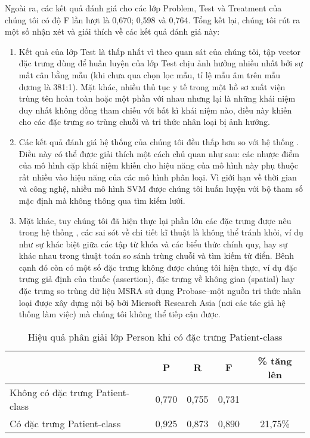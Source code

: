 Ngoài ra, các kết quả đánh giá cho các lớp Problem, Test và Treatment của chúng tôi có độ F lần lượt là 0,670; 0,598 và 0,764. Tổng kết lại, chúng tôi rút ra một số nhận xét và giải thích về các kết quả đánh giá này:
\begin{enumerate}
\item Kết quả của lớp Test là thấp nhất vì theo quan sát của chúng tôi, tập vector đặc trưng dùng để huấn luyện của lớp Test chịu ảnh hưởng nhiều nhất bởi sự mất cân bằng mẫu (khi chưa qua chọn lọc mẫu, tỉ lệ mẫu âm trên mẫu dương là 381:1). Mặt khác, nhiều thủ tục y tế trong một hồ sơ xuất viện trùng tên hoàn toàn hoặc một phần với nhau nhưng lại là những khái niệm duy nhất không đồng tham chiếu với bất kì khái niệm nào, điều này khiến cho các đặc trưng so trùng chuỗi và tri thức nhân loại bị ảnh hưởng.
\item Các kết quả đánh giá hệ thống của chúng tôi đều thấp hơn so với hệ thống \cite{YanXu2012}. Điều này có thể được giải thích một cách chủ quan như sau: các nhược điểm của mô hình cặp khái niệm khiến cho hiệu năng của mô hình này phụ thuộc rất nhiều vào hiệu năng của các mô hình phân loại. Vì giới hạn về thời gian và công nghệ, nhiều mô hình SVM được chúng tôi huấn luyện với bộ tham số mặc định mà không thông qua tìm kiếm lưới.
\item Mặt khác, tuy chúng tôi đã hiện thực lại phần lớn các đặc trưng được nêu trong hệ thống \cite{YanXu2012}, các sai sót về chi tiết kĩ thuật là không thể tránh khỏi, ví dụ như sự khác biệt giữa các tập từ khóa và các biểu thức chính quy, hay sự khác nhau trong thuật toán so sánh trùng chuỗi và tìm kiếm từ điển. Bênh cạnh đó còn có một số đặc trưng không được chúng tôi hiện thực, ví dụ đặc trưng giả định của thuốc (assertion), đặc trưng về không gian (spatial) hay đặc trưng so trùng dữ liệu MSRA sử dụng Probase--một nguồn tri thức nhân loại được xây dựng nội bộ bởi Micrsoft Research Asia (nơi các tác giả hệ thống \cite{YanXu2012} làm việc) mà chúng tôi không thể tiếp cận được.
\end{enumerate}

\begin{table}[th]
\centering{}
\caption{Hiệu quả phân giải lớp Person khi có đặc trưng Patient-class\label{tab:person-cmp}}
\footnotesize\sffamily
\begin{tabularx}{0.9\textwidth}{@{}lCCCC@{}}
\toprule
& \textbf{P} & \textbf{R} & \textbf{F} & \% tăng lên\\
\midrule
Không có đặc trưng Patient-class & 0,770 & 0,755 & 0,731 &\\
Có đặc trưng Patient-class & 0,925 & 0,873 & 0,890 & 21,75\%\\
\bottomrule
\end{tabularx}
\end{table}
